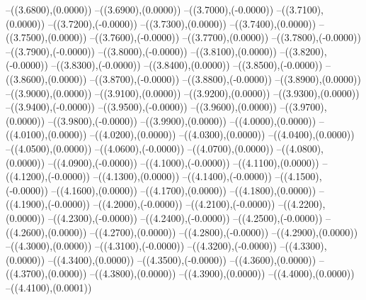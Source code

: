 {	--({\sx*(3.6800)},{\sy*(0.0000)})
	--({\sx*(3.6900)},{\sy*(0.0000)})
	--({\sx*(3.7000)},{\sy*(-0.0000)})
	--({\sx*(3.7100)},{\sy*(0.0000)})
	--({\sx*(3.7200)},{\sy*(-0.0000)})
	--({\sx*(3.7300)},{\sy*(0.0000)})
	--({\sx*(3.7400)},{\sy*(0.0000)})
	--({\sx*(3.7500)},{\sy*(0.0000)})
	--({\sx*(3.7600)},{\sy*(-0.0000)})
	--({\sx*(3.7700)},{\sy*(0.0000)})
	--({\sx*(3.7800)},{\sy*(-0.0000)})
	--({\sx*(3.7900)},{\sy*(-0.0000)})
	--({\sx*(3.8000)},{\sy*(-0.0000)})
	--({\sx*(3.8100)},{\sy*(0.0000)})
	--({\sx*(3.8200)},{\sy*(-0.0000)})
	--({\sx*(3.8300)},{\sy*(-0.0000)})
	--({\sx*(3.8400)},{\sy*(0.0000)})
	--({\sx*(3.8500)},{\sy*(-0.0000)})
	--({\sx*(3.8600)},{\sy*(0.0000)})
	--({\sx*(3.8700)},{\sy*(-0.0000)})
	--({\sx*(3.8800)},{\sy*(-0.0000)})
	--({\sx*(3.8900)},{\sy*(0.0000)})
	--({\sx*(3.9000)},{\sy*(0.0000)})
	--({\sx*(3.9100)},{\sy*(0.0000)})
	--({\sx*(3.9200)},{\sy*(0.0000)})
	--({\sx*(3.9300)},{\sy*(0.0000)})
	--({\sx*(3.9400)},{\sy*(-0.0000)})
	--({\sx*(3.9500)},{\sy*(-0.0000)})
	--({\sx*(3.9600)},{\sy*(0.0000)})
	--({\sx*(3.9700)},{\sy*(0.0000)})
	--({\sx*(3.9800)},{\sy*(-0.0000)})
	--({\sx*(3.9900)},{\sy*(0.0000)})
	--({\sx*(4.0000)},{\sy*(0.0000)})
	--({\sx*(4.0100)},{\sy*(0.0000)})
	--({\sx*(4.0200)},{\sy*(0.0000)})
	--({\sx*(4.0300)},{\sy*(0.0000)})
	--({\sx*(4.0400)},{\sy*(0.0000)})
	--({\sx*(4.0500)},{\sy*(0.0000)})
	--({\sx*(4.0600)},{\sy*(-0.0000)})
	--({\sx*(4.0700)},{\sy*(0.0000)})
	--({\sx*(4.0800)},{\sy*(0.0000)})
	--({\sx*(4.0900)},{\sy*(-0.0000)})
	--({\sx*(4.1000)},{\sy*(-0.0000)})
	--({\sx*(4.1100)},{\sy*(0.0000)})
	--({\sx*(4.1200)},{\sy*(-0.0000)})
	--({\sx*(4.1300)},{\sy*(0.0000)})
	--({\sx*(4.1400)},{\sy*(-0.0000)})
	--({\sx*(4.1500)},{\sy*(-0.0000)})
	--({\sx*(4.1600)},{\sy*(0.0000)})
	--({\sx*(4.1700)},{\sy*(0.0000)})
	--({\sx*(4.1800)},{\sy*(0.0000)})
	--({\sx*(4.1900)},{\sy*(-0.0000)})
	--({\sx*(4.2000)},{\sy*(-0.0000)})
	--({\sx*(4.2100)},{\sy*(-0.0000)})
	--({\sx*(4.2200)},{\sy*(0.0000)})
	--({\sx*(4.2300)},{\sy*(-0.0000)})
	--({\sx*(4.2400)},{\sy*(-0.0000)})
	--({\sx*(4.2500)},{\sy*(-0.0000)})
	--({\sx*(4.2600)},{\sy*(0.0000)})
	--({\sx*(4.2700)},{\sy*(0.0000)})
	--({\sx*(4.2800)},{\sy*(-0.0000)})
	--({\sx*(4.2900)},{\sy*(0.0000)})
	--({\sx*(4.3000)},{\sy*(0.0000)})
	--({\sx*(4.3100)},{\sy*(-0.0000)})
	--({\sx*(4.3200)},{\sy*(-0.0000)})
	--({\sx*(4.3300)},{\sy*(0.0000)})
	--({\sx*(4.3400)},{\sy*(0.0000)})
	--({\sx*(4.3500)},{\sy*(-0.0000)})
	--({\sx*(4.3600)},{\sy*(0.0000)})
	--({\sx*(4.3700)},{\sy*(0.0000)})
	--({\sx*(4.3800)},{\sy*(0.0000)})
	--({\sx*(4.3900)},{\sy*(0.0000)})
	--({\sx*(4.4000)},{\sy*(0.0000)})
	--({\sx*(4.4100)},{\sy*(0.0001)})
}
